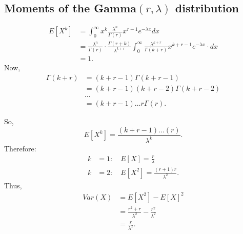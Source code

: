 \subsection{Moments of the Gamma$\left( r, \lambda \right) $ distribution}

\begin{align*}
	E\left[ X^{k} \right] &= \int_{0}^{\infty} x^{k}\frac{\lambda^{n}}{\Gamma\left( r \right) }x ^{r - 1}e ^{-\lambda x } dx  \\
			      &= \frac{\lambda^{n}}{\Gamma\left( r \right) } \cdot \frac{\Gamma\left( r + k \right)  }{\lambda ^{k + r}}\int_{0}^{\infty} \frac{\lambda^{k + r}}{\Gamma\left( k + r \right) } x ^{ k + r - 1} e ^{ -\lambda x } \cdot dx  \\
			      &= 1
.\end{align*}
Now, 
\begin{align*}
	\Gamma\left( k + r \right)  &= \left( k + r - 1 \right) \Gamma \left( k + r - 1 \right) \\
				    &= \left( k + r - 1 \right)  \left( k + r - 2 \right) \Gamma \left( k + r - 2 \right)  \\
				    &\ldots \\
				    &= \left( k + r - 1 \right) \ldots r  \Gamma\left( r \right) 
.\end{align*}

So,
 \[
	 E\left[ X^{k} \right] = \frac{\left( k + r - 1 \right) \ldots \left( r \right) }{\lambda^{k}}
.\] 
Therefore:
\begin{align*}
	k &= 1: \quad E \left[ X \right]  = \frac{r}{\lambda} \\
	k &= 2: \quad E\left[ X^{2} \right] = \frac{\left( r + 1 \right) r}{\lambda^2}
.\end{align*}
Thus, 
\begin{align*}
	Var\left( X \right) &= E\left[ X^{2} \right] - E \left[ X \right] ^2 \\
	&= \frac{r^2 + r }{\lambda^2} - \frac{r ^2}{\lambda^2} \\
	&= \frac{r}{\lambda^2}
.\end{align*} 
